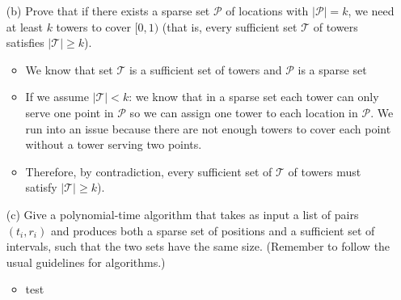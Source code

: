 \documentclass[letterpaper,11pt]{article}
\begin{document}
\begin{enumerate}
\begin{enumerate}
    \item[(b)] Prove that if there exists a sparse set $\mathcal{P}$ of locations with $\lvert\mathcal{P}\rvert = k$, 
    we  need at least $k$ towers to cover $[0,1)$ (that is, every sufficient set $\mathcal{T}$ of towers satisfies $\lvert \mathcal{T}\rvert \geq k$).
    \begin{itemize}
        \color{teal}
        \item We know that set $\mathcal{T}$ is a sufficient set of towers and 
            $\mathcal{P}$ is a sparse set
        \item If we assume $\lvert \mathcal{T}\rvert < k$: we know that in a 
            sparse set each tower can only serve one point in $\mathcal{P}$ 
            so we can assign one tower to each location in $\mathcal{P}$. We 
            run into an issue because there are not enough towers to cover
            each point without a tower serving two points.
        \item Therefore, by contradiction, every sufficient set of 
            $\mathcal{T}$ of towers must satisfy 
            $\lvert \mathcal{T}\rvert \geq k$).

    \end{itemize}
    \item[(c)] Give a polynomial-time algorithm that takes as input a list of pairs $(t_i,r_i)$ and produces both a sparse set of positions  and a sufficient set of intervals, such that the two sets have the same size. (Remember to follow the usual guidelines for algorithms.)
        \begin{itemize}
            \item test



\end{itemize}
\end{enumerate}
\end{enumerate}
\end{document}
